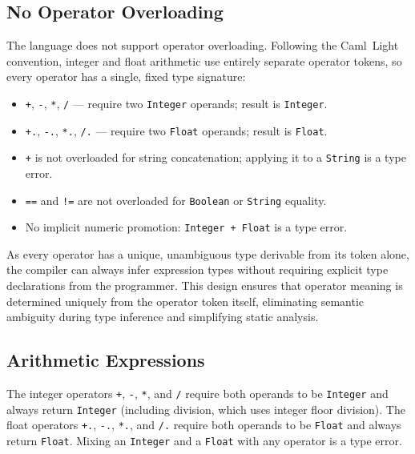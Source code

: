 \subsection{No Operator Overloading}
The language does not support operator overloading. Following the Caml~Light
convention, integer and float arithmetic use entirely separate operator tokens,
so every operator has a single, fixed type signature:
\begin{itemize}
  \item \texttt{+}, \texttt{-}, \texttt{*}, \texttt{/} --- require two \texttt{Integer} operands; result is \texttt{Integer}.
  \item \texttt{+.}, \texttt{-.}, \texttt{*.}, \texttt{/.} --- require two \texttt{Float} operands; result is \texttt{Float}.
  \item \texttt{+} is not overloaded for string concatenation; applying it to a \texttt{String} is a type error.
  \item \texttt{==} and \texttt{!=} are not overloaded for \texttt{Boolean} or \texttt{String} equality.
  \item No implicit numeric promotion: \texttt{Integer + Float} is a type error.
\end{itemize}
As every operator has a unique, unambiguous type derivable from its token
alone, the compiler can always infer expression types without requiring explicit
type declarations from the programmer. This design ensures that operator
meaning is determined uniquely from the operator token itself, eliminating
semantic ambiguity during type inference and simplifying static analysis.

\subsection{Arithmetic Expressions}
The integer operators \texttt{+}, \texttt{-}, \texttt{*}, and \texttt{/}
require both operands to be \texttt{Integer} and always return \texttt{Integer}
(including division, which uses integer floor division). The float operators
\texttt{+.}, \texttt{-.}, \texttt{*.}, and \texttt{/.} require both operands to
be \texttt{Float} and always return \texttt{Float}. Mixing an \texttt{Integer}
and a \texttt{Float} with any operator is a type error.

